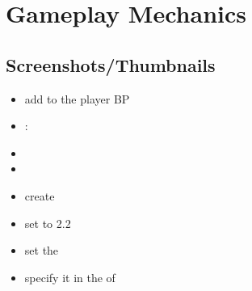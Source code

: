 \chapter{Gameplay Mechanics}
    \section{Screenshots/Thumbnails}
        \begin{itemize}
            \item add  to the player BP
            \item {}: 
            \item 
            \item 
            \item create 
            \item set  to 2.2
            \item set the 
            \item specify it in the  of 
        \end{itemize}

    